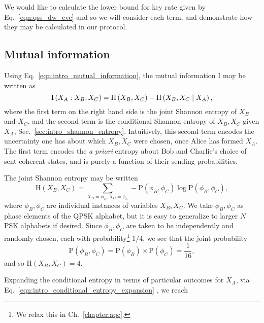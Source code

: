 We would like to calculate the lower bound for key rate given by Eq.~\ref{eqn:qss_dw_eve} and so we will consider each term, and demonstrate how they may be calculated in our protocol.



\subsection{Mutual information}

Using Eq.~\ref{eqn:intro_mutual_information}, the mutual information $\text{I}$ may be written as 
\begin{equation}\label{eqn:qss_deriv_1}
\text{I}\left(X_A : X_B, X_C\right) = \text{H}\left(X_B, X_C\right) - \text{H} \left(X_B, X_C \; \middle| \; X_A\right),
\end{equation}
where the first term on the right hand side is the joint Shannon entropy of $X_B$ and $X_C$, and the second term is the conditional Shannon entropy of $X_B, X_C$ given $X_A$, Sec.~\ref{sec:intro_shannon_entropy}. Intuitively, this second term encodes the uncertainty one has about which $X_B, X_C$ were chosen, once Alice has formed $X_A$. The first term encodes the \emph{a priori} entropy about Bob and Charlie's choice of sent coherent states, and is purely a function of their sending probabilities.

The joint Shannon entropy may be written
\begin{equation}\label{eqn:qss_deriv_2}
\text{H}\left(X_B, X_C\right) = \sum_{X_B=\phi_B, X_C=\phi_C} - \text{P}\left(\phi_B, \phi_C\right) \log \text{P}\left(\phi_B, \phi_C\right),
\end{equation}
where $\phi_B, \phi_C$ are individual instances of variables $X_B, X_C$. We take $\phi_B, \phi_C$ as phase elements of the QPSK alphabet, but it is easy to generalize to larger $N$PSK alphabets if desired. Since $\phi_B, \phi_C$ are taken to be independently and randomly chosen, each with probability\footnote{We relax this in Ch.~\ref{chapter:aqc}.} $1/4$, we see that the joint probability
\begin{equation}\label{eqn:qss_deriv_3}
\text{P}\left(\phi_B, \phi_C\right) = \text{P}\left(\phi_B\right)\times \text{P}\left(\phi_C\right) = \frac{1}{16},
\end{equation}
and so $\text{H}\left(X_B, X_C\right) = 4$. %

Expanding the conditional entropy in terms of particular outcomes for $X_A$, via Eq.~\ref{eqn:intro_conditional_entropy_expansion}%
, we reach

